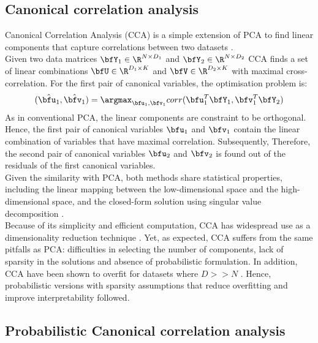 \subsection{Canonical correlation analysis} \label{cca}
Canonical Correlation Analysis (CCA) is a simple extension of PCA to find linear components that capture correlations between two datasets \cite{Hotteling1936,Hardle2007}.\\
Given two data matrices $\bfY_1 \in \R^{N \times D_1}$ and $\bfY_2 \in \R^{N \times D_2}$ CCA finds a set of linear combinations $\bfU \in \R^{D_1 \times K}$ and $\bfV \in \R^{D_2 \times K}$ with maximal cross-correlation.
For the first pair of canonical variables, the optimisation problem is:
\[
	(\hat{\bfu_1}, \hat{\bfv_1}) = \argmax_{\bfu_1,\bfv_1} corr(\bfu_{1}^T \bfY_1, \bfv_{1}^T \bfY_2)
\]
As in conventional PCA, the linear components are constraint to be orthogonal. Hence, the first pair of canonical variables $\bfu_1$ and $\bfv_1$ contain the linear combination of variables that have maximal correlation. Subsequently, Therefore, the second pair of canonical variables $\bfu_2$ and $\bfv_2$ is found out of the residuals of the first canonical variables.\\


Given the similarity with PCA, both methods share statistical properties, including the linear mapping between the low-dimensional space and the high-dimensional space, and the closed-form solution using singular value decomposition \cite{Hotteling1936,Hardle2007}.\\
Because of its simplicity and efficient computation, CCA has widespread use as a dimensionality reduction technique \cite{Hardle2007}. Yet, as expected, CCA suffers from the same pitfalls as PCA: difficulties in selecting the number of components, lack of sparsity in the solutions and absence of probabilistic formulation. In addition, CCA have been shown to overfit for datasets where $D>>N$ \cite{McCabe2018,Guo2016}. Hence, probabilistic versions with sparsity assumptions that reduce overfitting and improve interpretability followed.


\subsection{Probabilistic Canonical correlation analysis} \label{section_probabilisticCCA}

